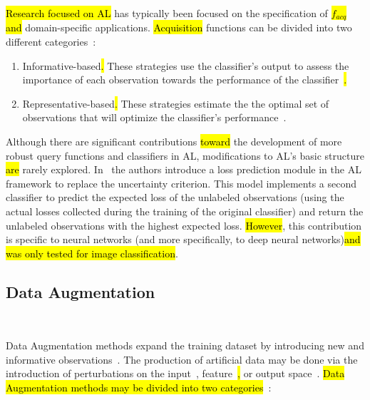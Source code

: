 \documentclass[preprint, 12pt]{elsarticle}
\begin{document}
\hl{Research focused on AL} has typically been focused on the
specification of \hl{$f_{acq}$ and} domain-specific
applications. \hl{Acquisition} functions can be divided into two different
categories~\cite{Gu2021, Kumar2020}: 

\begin{enumerate}

    \item Informative-based\hl{. }These strategies use the
        classifier's output to assess the importance of each observation
        towards the performance of the classifier~\cite{Fu2013}\hl{.}

    \item Representative-based\hl{. }These strategies estimate the
        the optimal set of observations that will optimize the classifier's
        performance~\cite{Kumar2020}.

\end{enumerate}

Although there are significant contributions \hl{toward} the development of
more robust query functions and classifiers in AL, modifications to AL's basic
structure \hl{are} rarely explored. In~\cite{Yoo2019} the authors introduce a
loss prediction module in the AL framework to replace the uncertainty
criterion.  This model implements a second classifier to predict the expected
loss of the unlabeled observations (using the actual losses collected during
the training of the original classifier) and return the unlabeled observations
with the highest expected loss. \hl{However}, this contribution is specific to
neural networks (and more specifically, to deep neural networks)\hl{and was
    only tested for image classification}.

\subsection{Data Augmentation}~\label{sec:data_augmentation}


Data Augmentation methods expand the training dataset by introducing new and
informative observations~\cite{Behpour2019}. The production of artificial data
may be done via the introduction of perturbations on the
input~\cite{Zhong2020}, feature~\cite{DeVries2017}\hl{,} or output
space~\cite{Behpour2019}. \hl{Data Augmentation methods may be divided into
two categories}~\cite{Shorten2019}:
\end{document}
